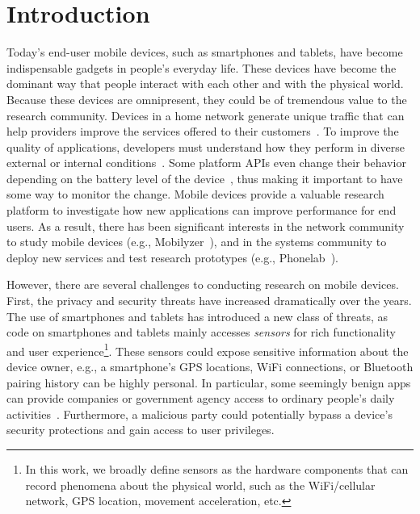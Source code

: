 \section{Introduction}

Today's end-user mobile devices, such as smartphones and
tablets, have become indispensable gadgets in people's everyday
life. These devices have become the dominant way that 
people interact with each other and with the physical world. Because 
these devices are omnipresent, they could be of tremendous value to 
the research community. Devices in a home network generate 
unique traffic that can help providers improve the services offered 
to their customers~\cite{sundaresan2011broadband}.
To improve the quality of applications, developers must understand 
how they perform in diverse external or internal 
conditions~\cite{ravindranath2012appinsight}. Some platform
APIs even change their behavior depending on the battery level
of the device~\cite{battery}, thus making it important to have 
some way to monitor the change. Mobile devices 
provide a valuable research platform to investigate how new 
applications can improve performance for end users. 
As a result, there has been significant interests in the network
community to study mobile devices
(e.g., Mobilyzer~\cite{nikravesh2015mobilyzer}), and in the
systems community to deploy new services and test research
prototypes (e.g., Phonelab~\cite{phonelab, nandugudi2013phonelab}).  
					
However, there are several challenges to conducting research
on mobile devices. First, the privacy and security threats
have increased dramatically over the years. The use of 
smartphones and tablets has introduced a new class of threats, 
as code on smartphones and tablets mainly accesses
\textit{sensors} for rich functionality and user experience\footnote{\scriptsize In 
this work, we broadly define sensors as the hardware components 
that can record phenomena about the physical world, such as the 
WiFi/cellular network, GPS location, movement acceleration, etc.}. 
These sensors could expose sensitive information about the device 
owner, e.g., a smartphone's GPS locations,
WiFi connections, or Bluetooth pairing history can be highly
personal. In particular, some seemingly benign apps can provide 
companies or government agency access to ordinary 
people's daily activities~\cite{AngryBirds}. Furthermore, 
a malicious party could potentially bypass a
device's security protections and gain access to user privileges. 

